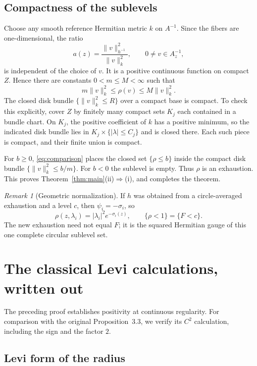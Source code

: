 \documentclass[11pt]{amsart}
\theoremstyle{definition}
\theoremstyle{remark}
\newtheorem{remark}[theorem]{Remark}
\numberwithin{equation}{section}
\begin{document}
\subsection{Compactness of the sublevels}

Choose any smooth reference Hermitian metric $k$ on $A^{-1}$.
Since the fibers are one-dimensional, the ratio
\[
a(z)=\frac{\|v\|_{h^{-1}}^2}{\|v\|_k^2},\qquad 0\ne v\in A^{-1}_z,
\]
is independent of the choice of $v$. It is a positive continuous
function on compact $Z$. Hence there are constants $0<m\le M<\infty$
such that
\begin{equation}\label{eq:comparison}
m\|v\|_k^2\le\rho(v)\le M\|v\|_k^2.
\end{equation}
The closed disk bundle $\{\|v\|_k^2\le R\}$ over a compact base is
compact. To check this explicitly, cover $Z$ by finitely many compact
sets $K_j$ each contained in a bundle chart. On $K_j$, the positive
coefficient of $k$ has a positive minimum, so the indicated disk
bundle lies in $K_j\times\{|\lambda|\le C_j\}$ and is closed there.
Each such piece is compact, and their finite union is compact.

For $b\ge0$, \eqref{eq:comparison} places the closed set
$\{\rho\le b\}$ inside the compact disk bundle
$\{\|v\|_k^2\le b/m\}$. For $b<0$ the sublevel is empty.
Thus $\rho$ is an exhaustion. This proves
Theorem~\ref{thm:main}(ii)$\Rightarrow$(i), and completes the theorem.

\begin{remark}[Geometric normalization]
If $h$ was obtained from a circle-averaged exhaustion and a level $c$,
then $\psi_i=-\sigma_i$, so
\[
\rho(z,\lambda_i)=|\lambda_i|^2e^{-\sigma_i(z)},\qquad
\{\rho<1\}=\{F<c\}.
\]
The new exhaustion need not equal $F$; it is the squared Hermitian
gauge of this one complete circular sublevel set.
\end{remark}

\section{The classical Levi calculations, written out}

The preceding proof establishes positivity at continuous regularity.
For comparison with the original Proposition~3.3, we verify its
$C^2$ calculation, including the sign and the factor $2$.

\subsection{Levi form of the radius}
\end{document}
